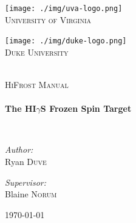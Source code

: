 \begin{titlepage}
\begin{center}

\noindent\begin{minipage}{.4\textwidth}
\centering
\texttt{[image: ./img/uva-logo.png]}~\\[.5cm]
\textsc{\normalsize University of Virginia}\\[1.5cm]
\end{minipage}
\hfill
\noindent\begin{minipage}{.4\textwidth}
\centering
\texttt{[image: ./img/duke-logo.png]}~\\[.5cm]
\textsc{\normalsize Duke University}\\[1.5cm]
\end{minipage}
\\[80pt]
\textsc{\Large HiFrost Manual}\\[0.5cm]

\HRule \\[0.4cm]
{ \huge \bfseries The HI$\gamma$S Frozen Spin Target \\[0.4cm] }

\HRule \\[1.5cm]

\begin{minipage}{0.4\textwidth}
\begin{flushleft} \large
\emph{Author:}\\
Ryan \textsc{Duve}
\end{flushleft}
\end{minipage}
\begin{minipage}{0.4\textwidth}
\begin{flushright} \large
\emph{Supervisor:} \\
Blaine \textsc{Norum}
\end{flushright}
\end{minipage}

\vfill

{\large \today}

\end{center}
\end{titlepage}